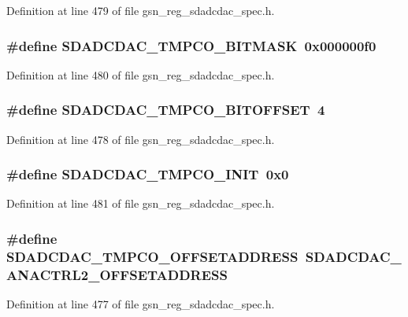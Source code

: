 Definition at line 479 of file gsn\_\-reg\_\-sdadcdac\_\-spec.h.

\hypertarget{a00569_a23cab56de848a301c059aeef381866ef}{
\subsubsection[{SDADCDAC\_\-TMPCO\_\-BITMASK}]{\setlength{\rightskip}{0pt plus 5cm}\#define SDADCDAC\_\-TMPCO\_\-BITMASK~0x000000f0}}
\label{a00569_a23cab56de848a301c059aeef381866ef}


Definition at line 480 of file gsn\_\-reg\_\-sdadcdac\_\-spec.h.

\hypertarget{a00569_a83937235c0eb733ebec1e8846047d215}{
\subsubsection[{SDADCDAC\_\-TMPCO\_\-BITOFFSET}]{\setlength{\rightskip}{0pt plus 5cm}\#define SDADCDAC\_\-TMPCO\_\-BITOFFSET~4}}
\label{a00569_a83937235c0eb733ebec1e8846047d215}


Definition at line 478 of file gsn\_\-reg\_\-sdadcdac\_\-spec.h.

\hypertarget{a00569_a04b5ca7767ca84b98cb277b3d5113bc8}{
\subsubsection[{SDADCDAC\_\-TMPCO\_\-INIT}]{\setlength{\rightskip}{0pt plus 5cm}\#define SDADCDAC\_\-TMPCO\_\-INIT~0x0}}
\label{a00569_a04b5ca7767ca84b98cb277b3d5113bc8}


Definition at line 481 of file gsn\_\-reg\_\-sdadcdac\_\-spec.h.

\hypertarget{a00569_a7aa4c7c5bce1045264f56c69fcef0015}{
\subsubsection[{SDADCDAC\_\-TMPCO\_\-OFFSETADDRESS}]{\setlength{\rightskip}{0pt plus 5cm}\#define SDADCDAC\_\-TMPCO\_\-OFFSETADDRESS~SDADCDAC\_\-ANACTRL2\_\-OFFSETADDRESS}}
\label{a00569_a7aa4c7c5bce1045264f56c69fcef0015}


Definition at line 477 of file gsn\_\-reg\_\-sdadcdac\_\-spec.h.

